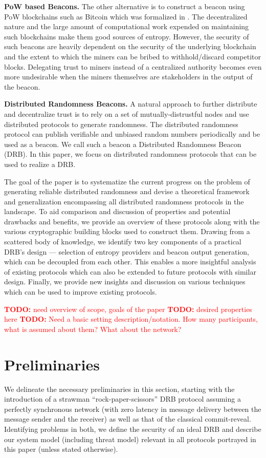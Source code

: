 \documentclass[letterpaper,twocolumn,10pt]{article}
\theoremstyle{definition}
\theoremstyle{remark}
\newcommand{\todo}[1]{\textcolor{red}{\textbf{TODO:} #1}}
\begin{document}
\textbf{PoW based Beacons.} The other alternative is to  construct a beacon using PoW blockchains such as Bitcoin \cite{nakamoto2019bitcoin} which was formalized in \cite{bonneau2015bitcoin}. The decentralized nature and the large amount of computational work expended on maintaining such blockchains make them good sources of entropy. However, the security of such beacons are heavily dependent on the security of the underlying blockchain and the extent to which the miners can be bribed to withhold/discard competitor blocks. Delegating trust to  miners instead of a centralized authority becomes even more undesirable when the miners themselves are stakeholders in the output of the beacon.

\textbf{Distributed Randomness Beacons.} 
A natural approach to further distribute and decentralize trust is to rely on a set of mutually-distrustful nodes and use distributed protocols to generate randomness. The distributed randomness protocol can publish verifiable and unbiased random numbers periodically and be used as a beacon. We call such a beacon a Distributed Randomness Beacon (DRB). In this paper, we focus on distributed randomness protocols that can be used to realize a DRB.

The goal of the paper is to systematize the current progress on the problem of generating reliable distributed randomness and devise a theoretical framework and generalization encompassing all distributed randomness protocols in the landscape. To aid comparison and discussion of properties and potential drawbacks and benefits, we provide an overview of these protocols along with the various cryptographic building blocks used to construct them. Drawing from a scattered body of knowledge, we identify two key components of a practical DRB's design --- selection of entropy providers and beacon output generation, which can be decoupled from each other. This enables a more insightful analysis of existing protocols which can also be extended to future protocols with similar design. Finally, we provide new insights and discussion on various techniques which can be used to improve existing protocols.

\todo{need overview of scope, goals of the paper}
\todo{desired properties here}
\todo{Need a basic setting description/notation. How many participants, what is assumed about them? What about the network?}

\section{Preliminaries}
We delineate the necessary preliminaries in this section, starting with the introduction of a strawman ``rock-paper-scissors'' DRB protocol assuming a perfectly synchronous network (with zero latency in message delivery between the message sender and the receiver) as well as that of the classical commit-reveal. Identifying problems in both, we define the security of an ideal DRB and describe our system model (including threat model) relevant in all protocols portrayed in this paper (unless stated otherwise).
\end{document}
